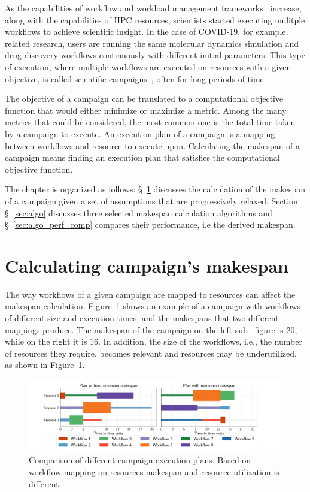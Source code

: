 \label{ch:campaigns}
As the capabilities of workflow and workload management frameworks~\cite{balasubramanian2018harnessing,deelman2015pegasus,maeno2008panda} increase, along with the capabilities of HPC resources, scientists started executing mulitple workflows to achieve scientific insight.
In the case of COVID-19, for example, related research, users are running the same molecular dynamics simulation and drug discovery workflows continuously with different initial parameters.
This type of execution, where multiple workflows are executed on resources with a given objective, is called scientific campaigns~\cite{maeno2008panda}, often for long periods of time~\cite{casajus2010dirac}.

The objective of a campaign can be translated to a computational objective function that would either minimize or maximize a metric.
Among the many metrics that could be considered, the most common one is the total time taken by a campaign to execute.
An execution plan of a campaign is a mapping between workflows and resource to execute upon.
Calculating the makespan of a campaign means finding an execution plan that satisfies the computational objective function.

The chapter is organized as follows: \S~\ref{sec:makespan_calc} discusses the calculation of the makespan of a campaign given a set of assumptions that are progressively relaxed.
Section \S~\ref{sec:algo} discusses three selected makespan calculation algorithms and \S~\ref{sec:algo_perf_comp} compares their performance, i.e the derived makespan.

\section{Calculating campaign's makespan}
\label{sec:makespan_calc}
The way workflows of a given campaign are mapped to resources can affect the makespan calculation. 
Figure~\ref{fig:example_makespan} shows an example of a campaign with workflows of different size and execution times, and the makespans that two different mappings produce.
The makespan of the campaign on the left sub~-figure is $20$, while on the right it is $16$.
In addition, the size of the workflows, i.e., the number of resources they require, becomes relevant and resources may be underutilized, as shown in Figure~\ref{fig:example_makespan}.

\begin{figure}[ht!]
    \centering
    \includegraphics[width=.99\textwidth]{figures/campaign/plan_comp.pdf}
    \caption{Comparison of different campaign execution plans. Based on workflow mapping on resources makespan and resource utilization is different.}\label{fig:example_makespan}
\end{figure}

